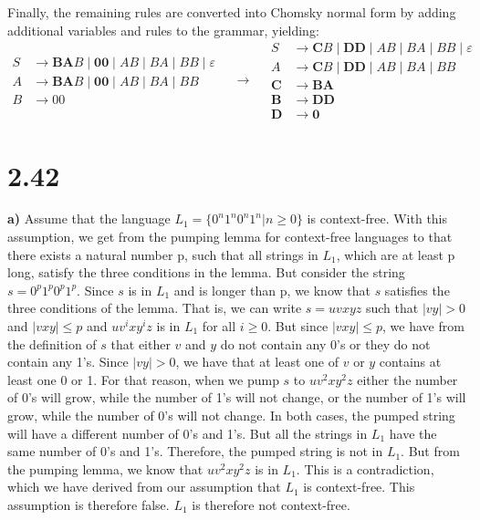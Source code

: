 \documentclass[12pt]{article}
\begin{document}
Finally, the remaining rules are converted into Chomsky normal form by adding additional variables and rules to the grammar, yielding:
\begin{equation*}
	\begin{split}
		S &\rightarrow \mathbf{BA}B \; | \; \mathbf{00} \; | \; AB \; | \; BA \; | \; BB \; | \; \varepsilon\\
    	A &\rightarrow \mathbf{BA}B \; | \; \mathbf{00} \; | \; AB \; | \; BA \; | \; BB\\
		B &\rightarrow 00
    \end{split}
\quad\longrightarrow\quad
	\begin{split}
		S &\rightarrow \mathbf{C}B \; | \; \mathbf{DD} \; | \; AB \; | \; BA \; | \; BB \; | \; \varepsilon\\
    	A &\rightarrow \mathbf{C}B \; | \; \mathbf{DD} \; | \; AB \; | \; BA \; | \; BB\\
		\mathbf{C} &\rightarrow \mathbf{BA}\\
		\mathbf{B} &\rightarrow \mathbf{DD}\\
		\mathbf{D} &\rightarrow \mathbf{0}
    \end{split}
\end{equation*}

\section*{2.42}
\textbf{a)} Assume that the language $L_1 = \{0^n1^n0^n1^n| n\geq 0 \}$ is context-free. With this assumption, we get from the pumping lemma for context-free languages to that there exists a natural number p, such that all strings in $L_1$, which are at least p long, satisfy the three conditions in the lemma. But consider the string $s=0^p1^p0^p1^p$. Since $s$ is in $L_1$ and is longer than p, we know that $s$ satisfies the three conditions of the lemma. That is, we can write $s=uvxyz$ such that $|vy|>0$ and $|vxy|\leq p$ and $uv^ixy^iz$ is in $L_1$ for all $i\geq 0$. But since $|vxy|\leq p$, we have from the definition of $s$ that either $v$ and $y$ do not contain any 0's or they do not contain any 1's. Since $|vy|>0$, we have that at least one of $v$ or $y$ contains at least one 0 or 1. For that reason, when we pump $s$ to $uv^2xy^2z$ either the number of 0's will grow, while the number of 1's will not change, or the number of 1's will grow, while the number of 0's will not change. In both cases, the pumped string will have a different number of 0's and 1's. But all the strings in $L_1$ have the same number of 0's and 1's. Therefore, the pumped string is not in $L_1$. But from the pumping lemma, we know that $uv^2xy^2z$ is in $L_1$. This is a contradiction, which we have derived from our assumption that $L_1$ is context-free. This assumption is therefore false. $L_1$ is therefore not context-free.
\end{document}

